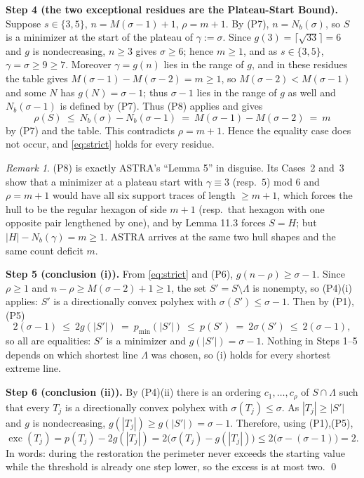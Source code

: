 \documentclass[11pt]{article}
\theoremstyle{plain}
\theoremstyle{remark}
\newtheorem{remark}[theorem]{Remark}
\newcommand{\sm}{\setminus}
\DeclareMathOperator{\exc}{exc}
\begin{document}
\medskip\noindent\textbf{Step 4 (the two exceptional residues are the Plateau-Start Bound).}
Suppose \(s\in\{3,5\}\), \(n=M(\sigma-1)+1\), \(\rho=m+1\). By (P7),
\(n=N_{b}(\sigma)\), so \(S\) is a minimizer at the start of the plateau of \(\gamma:=\sigma\).
Since \(g(3)=\lceil\sqrt{33}\rceil=6\) and \(g\) is nondecreasing, \(n\ge3\) gives
\(\sigma\ge6\); hence \(m\ge1\), and as \(s\in\{3,5\}\), \(\gamma=\sigma\ge9\ge7\).
Moreover \(\gamma=g(n)\) lies in the range of \(g\), and in these residues the table gives
\(M(\sigma-1)-M(\sigma-2)=m\ge1\), so \(M(\sigma-2)<M(\sigma-1)\) and some \(N\) has
\(g(N)=\sigma-1\); thus \(\sigma-1\) lies in the range of \(g\) as well and
\(N_{b}(\sigma-1)\) is defined by (P7). Thus (P8) applies and gives
\[
   \rho(S)\ \le\ N_{b}(\sigma)-N_{b}(\sigma-1)
   \ =\ M(\sigma-1)-M(\sigma-2)\ =\ m
\]
by (P7) and the table. This contradicts \(\rho=m+1\). Hence the equality case does not occur,
and \eqref{eq:strict} holds for every residue.

\begin{remark}
(P8) is exactly ASTRA's ``Lemma 5'' in disguise. Its Cases~2 and~3 show that a minimizer at a
plateau start with \(\gamma\equiv3\) (resp.\ \(5\)) mod \(6\) and \(\rho=m+1\) would have all
six support traces of length \(\ge m+1\), which forces the hull to be the regular hexagon of
side \(m+1\) (resp.\ that hexagon with one opposite pair lengthened by one), and by
Lemma 11.3 forces \(S=H\); but \(|H|-N_{b}(\gamma)=m\ge1\). ASTRA arrives at the same two
hull shapes and the same count deficit \(m\).
\end{remark}

\medskip\noindent\textbf{Step 5 (conclusion (i)).}
From \eqref{eq:strict} and (P6), \(g(n-\rho)\ge\sigma-1\). Since \(\rho\ge1\) and
\(n-\rho\ge M(\sigma-2)+1\ge1\), the set \(S'=S\sm\Lambda\) is nonempty, so (P4)(i) applies:
\(S'\) is a directionally convex polyhex with \(\sigma(S')\le\sigma-1\). Then by (P1),(P5)
\[
   2(\sigma-1)\ \le\ 2g(|S'|)\ =\ p_{\min}(|S'|)\ \le\ p(S')\ =\ 2\sigma(S')\ \le\ 2(\sigma-1),
\]
so all are equalities: \(S'\) is a minimizer and \(g(|S'|)=\sigma-1\). Nothing in Steps 1--5
depends on which shortest line \(\Lambda\) was chosen, so (i) holds for every shortest
extreme line.

\medskip\noindent\textbf{Step 6 (conclusion (ii)).}
By (P4)(ii) there is an ordering \(c_{1},\dots,c_{\rho}\) of \(S\cap\Lambda\) such that every
\(T_{j}\) is a directionally convex polyhex with \(\sigma(T_{j})\le\sigma\). As
\(|T_{j}|\ge|S'|\) and \(g\) is nondecreasing, \(g(|T_{j}|)\ge g(|S'|)=\sigma-1\). Therefore,
using (P1),(P5),
\[
   \exc(T_{j})=p(T_{j})-2g(|T_{j}|)=2\bigl(\sigma(T_{j})-g(|T_{j}|)\bigr)
   \le2\bigl(\sigma-(\sigma-1)\bigr)=2 .
\]
In words: during the restoration the perimeter never exceeds the starting value while the
threshold is already one step lower, so the excess is at most two. \qed
\end{document}

